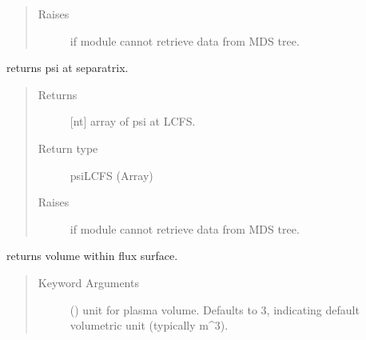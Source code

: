\documentclass[letterpaper,10pt,english]{sphinxmanual}
\begin{document}
\begin{fulllineitems}
\begin{fulllineitems}
\begin{quote}
\begin{description}
\item[{Raises}] \leavevmode
{} \textendash{} if module cannot retrieve data from MDS tree.

\end{description}\end{quote}

\end{fulllineitems}


\begin{fulllineitems}
\label{\detokenize{eqtools:eqtools.EFIT.EFITTree.getFluxLCFS}}
returns psi at separatrix.
\begin{quote}\begin{description}
\item[{Returns}] \leavevmode
{[}nt{]} array of psi at LCFS.

\item[{Return type}] \leavevmode
psiLCFS (Array)

\item[{Raises}] \leavevmode
{} \textendash{} if module cannot retrieve data from MDS tree.

\end{description}\end{quote}

\end{fulllineitems}


\begin{fulllineitems}
\label{\detokenize{eqtools:eqtools.EFIT.EFITTree.getFluxVol}}
returns volume within flux surface.
\begin{quote}\begin{description}
\item[{Keyword Arguments}] \leavevmode
{} () \textendash{} unit for plasma volume.  Defaults to 3,
indicating default volumetric unit (typically m\textasciicircum{}3).


\end{description}
\end{quote}
\end{fulllineitems}
\end{fulllineitems}
\end{document}

